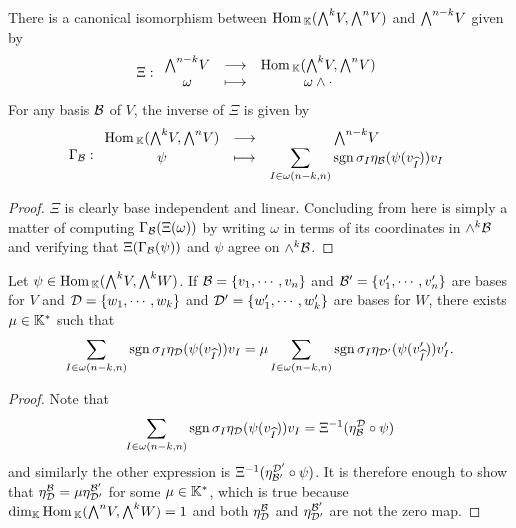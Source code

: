 \begin{proposition}\label{CanonicalIso}
There is a canonical isomorphism between $\Hom_\K(\bw V,\bw[n]V)$ and $\bw[n-k]V$ given by
\[\Xi:\funcDef{\bw[n-k]V}{\Hom_\K(\bw V, \bw[n]V)}{\omega}{\omega\wedge \cdot}\]
For any basis $\mathcal{B}$ of $V$, the inverse of $\Xi$ is given by 
\[\Gamma_\Bc:\funcDef{\Hom_\K(\bw V,\bw[n]V)}{\bw[n-k]V}{\psi}{\displaystyle \sum_{I\in\omega(n-k,n)}\sgn\sigma_I\eta_\Bc(\psi(v_{\wh I}))v_I}\]
\end{proposition}
\begin{proof}
$\Xi$ is clearly base independent and linear. Concluding from here is simply a matter of computing $\Gamma_{\mathcal{B}}(\Xi(\omega))$ by writing $\omega$ in terms of its coordinates in $\wedge^k\mathcal{B}$ and verifying that $\Xi(\Gamma_{\mathcal{B}}(\psi))$ and $\psi$ agree on $\wedge^k\mathcal{B}$.
\end{proof}
\begin{corollary}\label{UpToScalarCanonicalIso}
Let $\psi\in \Hom_\K(\bw V,\bw W)$. If $\mathcal{B}=\left\{{v_1,\cdots, v_n}\right\}$ and $\mathcal{B}'=\left\{{v_1',\cdots, v_n'}\right\}$ are bases for $V$ and $\mathcal{D}=\left\{{w_1,\cdots,w_k}\right\}$ and $\mathcal{D}'=\left\{{w_1',\cdots,w_k'}\right\}$ are bases for $W$, there exists $\mu\in\mathbb{K}^\ast$ such that
\[\sum_{I\in\omega(n-k,n)}\mathrm{sgn}\,\sigma_I\eta_{\mathcal{D}}(\psi(v_{\widehat{I}}))v_I=\mu \sum_{I\in\omega(n-k,n)}\mathrm{sgn}\,\sigma_I\eta_{\mathcal{D}'}(\psi(v'_{\widehat{I}}))v'_I.\]
\end{corollary}
\begin{proof}
Note that
\[\sum_{I\in\omega(n-k,n)}\mathrm{sgn}\,\sigma_I\eta_{\mathcal{D}}(\psi(v_{\widehat{I}}))v_I=\Xi^{-1}(\eta^{\mathcal{D}}_{\mathcal{B}}\circ \psi)\]
and similarly the other expression is $\Xi^{-1}(\eta^{\mathcal{D}'}_{\mathcal{B}'}\circ \psi)$. 
It is therefore enough to show that $\eta^{\mathcal{B}}_{\mathcal{D}}=\mu\eta^{\mathcal{B}'}_{\mathcal{D}'}$ for some $\mu\in \mathbb{K}^\ast$, which is true because $\dim_\K\Hom_\K(\bw[n]V,\bw W)=1$ and both $\eta^{\mathcal{B}}_{\mathcal{D}}$ and $\eta^{\mathcal{B}'}_{\mathcal{D}'}$ are not the zero map.
\end{proof}





